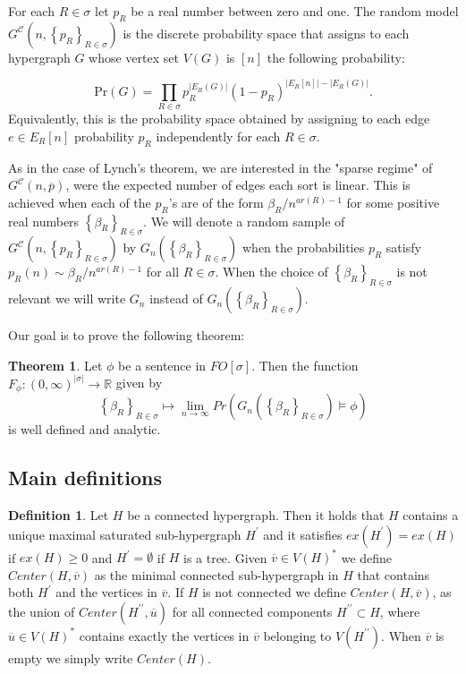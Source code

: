 \documentclass[12pt,notitlepage,a4paper]{article}
\theoremstyle{definition}
\newtheorem{theorem}{Theorem}[section]
\newtheorem{definition}{Definition}[section]
\newcommand{\R}{\mathbb{R}}
\newcommand{\Ln}{\lim\limits_{n\to \infty}}
\newcommand{\InR}[1]{\left\{ #1_R \right\}_{R\in \sigma}}
\begin{document}
For each $R\in \sigma$ let
$p_R$ be a real number between zero and one.
The random model $G^{\mathcal{C}}\left(n,\InR{p}\right)$ 
is the discrete probability space that
assigns to each hypergraph $G$ whose vertex
set $V(G)$ is $[n]$ the following probability:

\[ \mathrm{Pr}(G)=\prod_{R\in \sigma} p_R^{|E_R(G)|}
(1-p_R)^{ \big|E_R[n]\big|-\big|E_R(G)\big|}.	
\]
Equivalently, this is the probability space obtained by 
assigning to each edge $e\in E_R[n]$ probability 
$p_R$ independently for each $R\in \sigma$. \par

As in the case of Lynch's theorem, we are interested in the
"sparse regime" of $G^\mathcal{C}(n,\overline{p})$, were the 
expected number of edges each sort is linear. 
This is achieved when each of the $p_R$'s are 
of the form $\beta_R/n^{ar(R)-1}$ for some 
positive real numbers $\InR{\beta}$.
We will denote a random sample of 
$G^\mathcal{C}\left(n,\left\{p_R\right\}_{R\in\sigma}\right)$
by $G_n\left(\InR{\beta}\right)$ when the probabilities $p_R$
satisfy $p_R(n)\sim \beta_R/n^{ar(R)-1}$ for all $R\in \sigma$.
When the choice of $\InR{\beta}$ is not relevant
we will write $G_n$ instead of 
$G_n\left(\InR{\beta}\right)$.\par

Our goal is to prove the following theorem:


\begin{theorem} \label{thm:main}
	Let $\phi$ be a sentence in $FO[\sigma]$. Then
	the function
	$F_\phi: (0,\infty)^{|\sigma|}
	\rightarrow \R$ given by 
	\[
	\InR{\beta} \mapsto \Ln Pr\left( G_n\left(
	\InR{\beta}\right) \models \phi\right)
	\]
	is well defined and analytic. 
\end{theorem}

\subsection{Main definitions}

\begin{definition} 
Let $H$ be a connected hypergraph. Then it holds that
$H$ contains a unique maximal saturated sub-hypergraph $H^\prime$
and it satisfies $ex(H^\prime)=ex(H)$ if $ex(H)\geq 0$ and $H^\prime=\emptyset$ 
if $H$ is a tree. Given
$\overline{v}\in V(H)^*$ we define $Center(H,\overline{v})$ as the 
minimal connected sub-hypergraph in $H$ that contains both $H^\prime$
and the vertices in $\overline{v}$. 
If $H$ is not connected 
we define $Center(H,\overline{v})$,
as the union of $Center(H^{\prime\prime},\overline{u})$
for all connected components $H^{\prime\prime} \subset H$,
where $\overline{u}\in V(H)^*$ contains exactly the vertices
in $\overline{v}$ belonging to $V(H^{\prime\prime})$. When $\overline{v}$
is empty we simply write $Center(H)$.
\end{definition}
\end{document}
